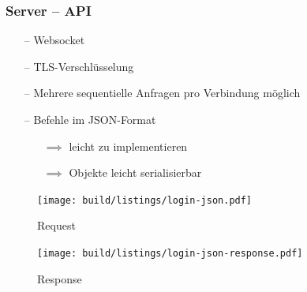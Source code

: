 \documentclass[aspectratio=1610]{beamer}
\begin{document}
  \begin{frame}[plain]
      \frametitle{\textbf{Server} -- API}
      \begin{minipage}{0.45\textwidth}
          \begin{itemize}
              \item[--] Websocket
              \item[--] TLS-Verschlüsselung
              \item[--] Mehrere sequentielle Anfragen pro Verbindung möglich
              \item[--] Befehle im JSON-Format
                  \begin{itemize}
                      \item[$\implies$] leicht zu implementieren
                      \item[$\implies$] Objekte leicht serialisierbar
                  \end{itemize}
          \end{itemize}
      \end{minipage}%
      \hspace{.05\textwidth}%
      \begin{minipage}{0.5\textwidth}
          \begin{figure}
              \texttt{[image: build/listings/login-json.pdf]}
              \caption{Request}
          \end{figure}
          \begin{figure}
              \texttt{[image: build/listings/login-json-response.pdf]}
              \caption{Response}
          \end{figure}
      \end{minipage}%
  \end{frame}
\end{document}
